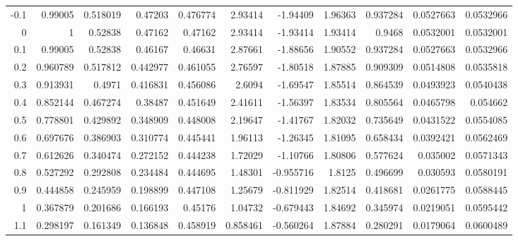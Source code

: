 {\begin{tabular}{rrrrrrrrrrr}
 -0.1         & 0.99005    & 0.518019    &   0.47203     &     0.476774  & 2.93414    &   -1.94409    &      1.96363  & 0.937284   &   0.0527663   &   0.0532966   \\
  0 & 1          & 0.52838     &   0.47162     &     0.47162   & 2.93414    &   -1.93414    &      1.93414  & 0.9468     &   0.0532001   &   0.0532001   \\
  0.1         & 0.99005    & 0.52838     &   0.46167     &     0.46631   & 2.87661    &   -1.88656    &      1.90552  & 0.937284   &   0.0527663   &   0.0532966   \\
  0.2         & 0.960789   & 0.517812    &   0.442977    &     0.461055  & 2.76597    &   -1.80518    &      1.87885  & 0.909309   &   0.0514808   &   0.0535818   \\
  0.3         & 0.913931   & 0.4971      &   0.416831    &     0.456086  & 2.6094     &   -1.69547    &      1.85514  & 0.864539   &   0.0493923   &   0.0540438   \\
  0.4         & 0.852144   & 0.467274    &   0.38487     &     0.451649  & 2.41611    &   -1.56397    &      1.83534  & 0.805564   &   0.0465798   &   0.054662    \\
  0.5         & 0.778801   & 0.429892    &   0.348909    &     0.448008  & 2.19647    &   -1.41767    &      1.82032  & 0.735649   &   0.0431522   &   0.0554085   \\
  0.6         & 0.697676   & 0.386903    &   0.310774    &     0.445441  & 1.96113    &   -1.26345    &      1.81095  & 0.658434   &   0.0392421   &   0.0562469   \\
  0.7         & 0.612626   & 0.340474    &   0.272152    &     0.444238  & 1.72029    &   -1.10766    &      1.80806  & 0.577624   &   0.035002    &   0.0571343   \\
  0.8         & 0.527292   & 0.292808    &   0.234484    &     0.444695  & 1.48301    &   -0.955716   &      1.8125   & 0.496699   &   0.030593    &   0.0580191   \\
  0.9         & 0.444858   & 0.245959    &   0.198899    &     0.447108  & 1.25679    &   -0.811929   &      1.82514  & 0.418681   &   0.0261775   &   0.0588445   \\
  1           & 0.367879   & 0.201686    &   0.166193    &     0.45176   & 1.04732    &   -0.679443   &      1.84692  & 0.345974   &   0.0219051   &   0.0595442   \\
  1.1         & 0.298197   & 0.161349    &   0.136848    &     0.458919  & 0.858461   &   -0.560264   &      1.87884  & 0.280291   &   0.0179064   &   0.0600489   \\

\end{tabular}}

